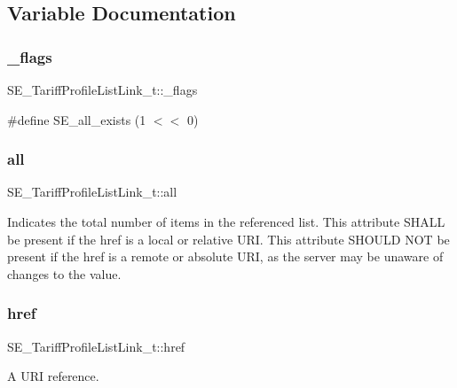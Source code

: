 \subsection{Variable Documentation}
\mbox{\label{group__TariffProfileListLink_ga0dc6e32b1d1482a70c30f1f8d19952a0}} 
\subsubsection{\texorpdfstring{\+\_\+flags}{\_flags}}
{\footnotesize\ttfamily S\+E\+\_\+\+Tariff\+Profile\+List\+Link\+\_\+t\+::\+\_\+flags}

\#define S\+E\+\_\+all\+\_\+exists (1 $<$$<$ 0) \mbox{\label{group__TariffProfileListLink_ga7a7b6ee13dc95e02bb1511987c9bcbc6}} 
\subsubsection{\texorpdfstring{all}{all}}
{\footnotesize\ttfamily S\+E\+\_\+\+Tariff\+Profile\+List\+Link\+\_\+t\+::all}

Indicates the total number of items in the referenced list. This attribute S\+H\+A\+LL be present if the href is a local or relative U\+RI. This attribute S\+H\+O\+U\+LD N\+OT be present if the href is a remote or absolute U\+RI, as the server may be unaware of changes to the value. \mbox{\label{group__TariffProfileListLink_gaf7827e008cf5e071627cedf3e60ac752}} 
\subsubsection{\texorpdfstring{href}{href}}
{\footnotesize\ttfamily S\+E\+\_\+\+Tariff\+Profile\+List\+Link\+\_\+t\+::href}

A U\+RI reference. 